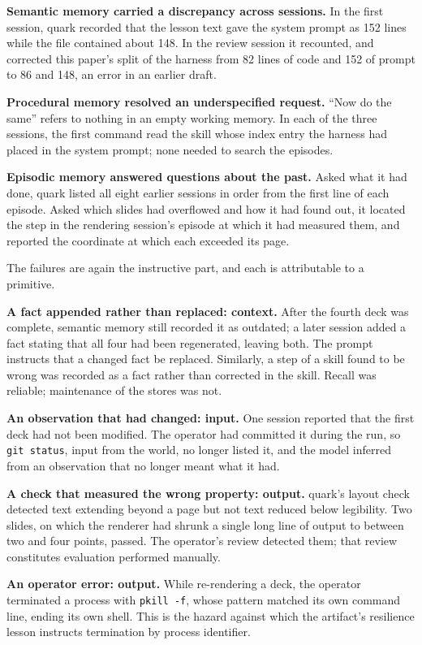 \textbf{Semantic memory carried a discrepancy across sessions.} In the first session, quark recorded that the lesson text gave the system prompt as 152 lines while the file contained about 148. In the review session it recounted, and corrected this paper's split of the harness from 82 lines of code and 152 of prompt to 86 and 148, an error in an earlier draft.

\textbf{Procedural memory resolved an underspecified request.} ``Now do the same'' refers to nothing in an empty working memory. In each of the three sessions, the first command read the skill whose index entry the harness had placed in the system prompt; none needed to search the episodes.

\textbf{Episodic memory answered questions about the past.} Asked what it had done, quark listed all eight earlier sessions in order from the first line of each episode. Asked which slides had overflowed and how it had found out, it located the step in the rendering session's episode at which it had measured them, and reported the coordinate at which each exceeded its page.

The failures are again the instructive part, and each is attributable to a primitive.

\textbf{A fact appended rather than replaced: context.} After the fourth deck was complete, semantic memory still recorded it as outdated; a later session added a fact stating that all four had been regenerated, leaving both. The prompt instructs that a changed fact be replaced. Similarly, a step of a skill found to be wrong was recorded as a fact rather than corrected in the skill. Recall was reliable; maintenance of the stores was not.

\textbf{An observation that had changed: input.} One session reported that the first deck had not been modified. The operator had committed it during the run, so \passthrough{\lstinline!git status!}, input from the world, no longer listed it, and the model inferred from an observation that no longer meant what it had.

\textbf{A check that measured the wrong property: output.} quark's layout check detected text extending beyond a page but not text reduced below legibility. Two slides, on which the renderer had shrunk a single long line of output to between two and four points, passed. The operator's review detected them; that review constitutes evaluation performed manually.

\textbf{An operator error: output.} While re-rendering a deck, the operator terminated a process with \passthrough{\lstinline!pkill -f!}, whose pattern matched its own command line, ending its own shell. This is the hazard against which the artifact's resilience lesson instructs termination by process identifier.

